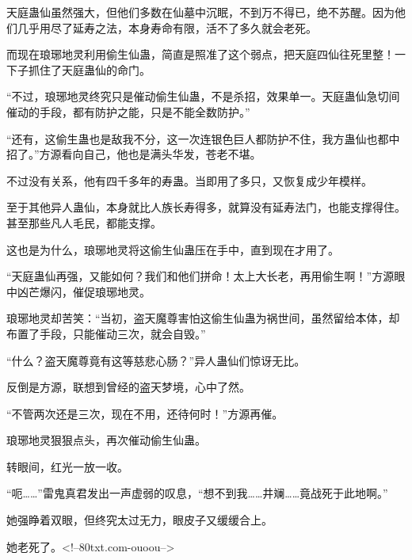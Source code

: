 \begin{this_body}
天庭蛊仙虽然强大，但他们多数在仙墓中沉眠，不到万不得已，绝不苏醒。因为他们几乎用尽了延寿之法，本身寿命有限，活不了多久就会老死。

而现在琅琊地灵利用偷生仙蛊，简直是照准了这个弱点，把天庭四仙往死里整！一下子抓住了天庭蛊仙的命门。

“不过，琅琊地灵终究只是催动偷生仙蛊，不是杀招，效果单一。天庭蛊仙急切间催动的手段，都有防护之能，只是不能全数防护。”

“还有，这偷生蛊也是敌我不分，这一次连银色巨人都防护不住，我方蛊仙也都中招了。”方源看向自己，他也是满头华发，苍老不堪。

不过没有关系，他有四千多年的寿蛊。当即用了多只，又恢复成少年模样。

至于其他异人蛊仙，本身就比人族长寿得多，就算没有延寿法门，也能支撑得住。甚至那些凡人毛民，都能支撑。

这也是为什么，琅琊地灵将这偷生仙蛊压在手中，直到现在才用了。

“天庭蛊仙再强，又能如何？我们和他们拼命！太上大长老，再用偷生啊！”方源眼中凶芒爆闪，催促琅琊地灵。

琅琊地灵却苦笑：“当初，盗天魔尊害怕这偷生仙蛊为祸世间，虽然留给本体，却布置了手段，只能催动三次，就会自毁。”

“什么？盗天魔尊竟有这等慈悲心肠？”异人蛊仙们惊讶无比。

反倒是方源，联想到曾经的盗天梦境，心中了然。

“不管两次还是三次，现在不用，还待何时！”方源再催。

琅琊地灵狠狠点头，再次催动偷生仙蛊。

转眼间，红光一放一收。

“呃……”雷鬼真君发出一声虚弱的叹息，“想不到我……井斓……竟战死于此地啊。”

她强睁着双眼，但终究太过无力，眼皮子又缓缓合上。

她老死了。<!--80txt.com-ouoou-->

\end{this_body}

